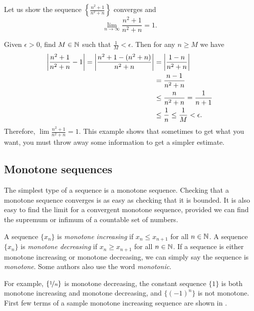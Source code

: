 \begin{example}
Let us show the sequence $\left\{ \frac{n^2+1}{n^2+n} \right\}$ converges and
\begin{equation*}
\lim_{n\to\infty} \frac{n^2+1}{n^2+n} = 1 .
\end{equation*}

Given $\epsilon > 0$,
find $M \in {\mathbb{N}}$ such that $\frac{1}{M} < \epsilon$.  Then for any $n \geq
M$ we have
\begin{equation*}
\begin{split}
\left\lvert {\frac{n^2+1}{n^2+n} - 1} \right\rvert  =
\left\lvert {\frac{n^2+1 - (n^2+n)}{n^2+n}} \right\rvert
& =
\left\lvert {\frac{1 - n}{n^2+n}} \right\rvert \\
& =
\frac{n-1}{n^2+n} \\
& \leq 
\frac{n}{n^2+n} 
 =
\frac{1}{n+1}  \\
& \leq \frac{1}{n}
\leq \frac{1}{M} < \epsilon .
\end{split}
\end{equation*}
Therefore,
$\lim \frac{n^2+1}{n^2+n} = 1$.
This example shows that sometimes to get what you want, you must throw away
some information to get a simpler estimate.
\end{example}

\subsection{Monotone sequences}

The simplest type of a sequence is a monotone sequence.  Checking that
a monotone sequence converges is as easy as checking that it is bounded.
It is also easy to find
the limit for a convergent
monotone sequence, provided we can find the supremum or infimum
of a countable set of numbers.

\begin{defn}
A sequence $\{ x_n \}$ is \emph{monotone increasing} if $x_n \leq x_{n+1}$ for all $n \in {\mathbb{N}}$.  
%
A sequence $\{ x_n \}$ is \emph{monotone decreasing} if $x_n \geq x_{n+1}$ for all $n \in {\mathbb{N}}$.  
%
If a sequence is either monotone increasing or monotone decreasing, we
can simply say the sequence is \emph{monotone}.  Some
authors also use the word \emph{monotonic}.
\end{defn}

For example, $\{ \nicefrac{1}{n} \}$ is monotone decreasing,
the constant sequence $\{ 1 \}$ is both monotone increasing and monotone
decreasing, and $\{ {(-1)}^n \}$ is not monotone.
First few terms of a sample monotone increasing sequence
are shown in 
.

